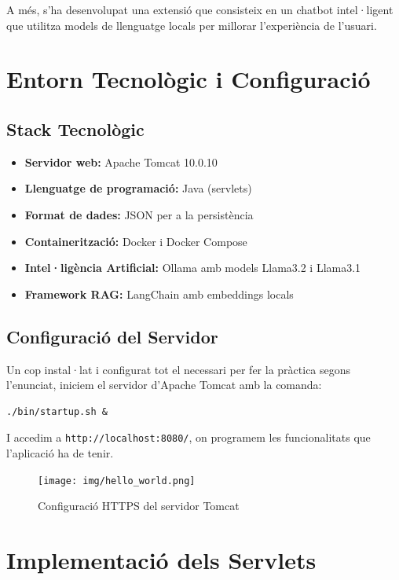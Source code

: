 \documentclass[12pt,a4paper]{article}
\begin{document}
A més, s'ha desenvolupat una extensió que consisteix en un chatbot intel·ligent que utilitza models de llenguatge locals per millorar l'experiència de l'usuari.

\section{Entorn Tecnològic i Configuració}

\subsection{Stack Tecnològic}

\begin{itemize}
    \item \textbf{Servidor web:} Apache Tomcat 10.0.10
    \item \textbf{Llenguatge de programació:} Java (servlets)
    \item \textbf{Format de dades:} JSON per a la persistència
    \item \textbf{Containerització:} Docker i Docker Compose
    \item \textbf{Intel·ligència Artificial:} Ollama amb models Llama3.2 i Llama3.1
    \item \textbf{Framework RAG:} LangChain amb embeddings locals
\end{itemize}

\subsection{Configuració del Servidor}

Un cop instal·lat i configurat tot el necessari per fer la pràctica segons l'enunciat, iniciem el servidor d'Apache Tomcat amb la comanda:

\begin{lstlisting}[style=shellstyle]
./bin/startup.sh &
\end{lstlisting}

I accedim a \texttt{http://localhost:8080/}, on programem les funcionalitats que l'aplicació ha de tenir.

\begin{figure}[H]
\centering
\texttt{[image: img/hello\_world.png]}
\caption{Configuració HTTPS del servidor Tomcat}
\end{figure}

\section{Implementació dels Servlets}
\end{document}
